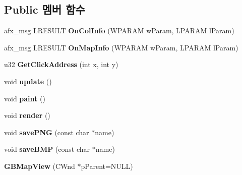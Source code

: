 \subsection*{Public 멤버 함수}
\begin{DoxyCompactItemize}
\item 
\mbox{\label{class_g_b_map_view_a6a6842be36789566f8fc918ded572bbe}} 
afx\+\_\+msg L\+R\+E\+S\+U\+LT {\bfseries On\+Col\+Info} (W\+P\+A\+R\+AM w\+Param, L\+P\+A\+R\+AM l\+Param)
\item 
\mbox{\label{class_g_b_map_view_afcc3ed555a52330d768b2cfb0f726dfc}} 
afx\+\_\+msg L\+R\+E\+S\+U\+LT {\bfseries On\+Map\+Info} (W\+P\+A\+R\+AM w\+Param, L\+P\+A\+R\+AM l\+Param)
\item 
\mbox{\label{class_g_b_map_view_a8071362b1d60245c02266c3d48d51495}} 
u32 {\bfseries Get\+Click\+Address} (int x, int y)
\item 
\mbox{\label{class_g_b_map_view_af907981b2a105364f52d9fc11030a200}} 
void {\bfseries update} ()
\item 
\mbox{\label{class_g_b_map_view_a42de669273417186b01ca6f8d06eb347}} 
void {\bfseries paint} ()
\item 
\mbox{\label{class_g_b_map_view_a48aeac68f689682206749e933513b98e}} 
void {\bfseries render} ()
\item 
\mbox{\label{class_g_b_map_view_a18226efdae32cdcf93b2994d2c002a02}} 
void {\bfseries save\+P\+NG} (const char $\ast$name)
\item 
\mbox{\label{class_g_b_map_view_a90fcc5d761fb5dfdb8f61e405831f3b5}} 
void {\bfseries save\+B\+MP} (const char $\ast$name)
\item 
\mbox{\label{class_g_b_map_view_ab0e95e7d8dd6638a2451b7faa6937acb}} 
{\bfseries G\+B\+Map\+View} (C\+Wnd $\ast$p\+Parent=N\+U\+LL)
\end{DoxyCompactItemize}
